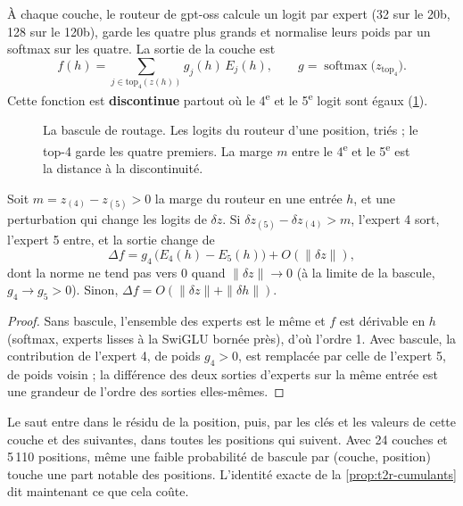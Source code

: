 À chaque couche, le routeur de gpt-oss calcule un logit par expert (32 sur le 20b, 128 sur le 120b), garde les quatre plus grands et normalise leurs poids par un softmax sur les quatre. La sortie de la couche est
\[
f(h) = \sum_{j \in \mathrm{top}_4(z(h))} g_j(h)\, E_j(h), \qquad g = \operatorname{softmax}\big(z_{\mathrm{top}_4}\big).
\]
Cette fonction est \textbf{discontinue} partout où le 4\textsuperscript{e} et le 5\textsuperscript{e} logit sont égaux (\cref{fig:t2r-bascule}).

\begin{figure}[ht]
\centering
\SchemaRefBascule
\caption[La bascule de routage]{La bascule de routage. Les logits du routeur d'une position, triés ; le top-4 garde les quatre premiers. La marge $m$ entre le 4\textsuperscript{e} et le 5\textsuperscript{e} est la distance à la discontinuité.}
\label{fig:t2r-bascule}
\end{figure}

\begin{proposition}\label{prop:t2r-saut}
Soit $m = z_{(4)} - z_{(5)} > 0$ la marge du routeur en une entrée $h$, et une perturbation qui change les logits de $\delta z$. Si $\delta z_{(5)} - \delta z_{(4)} > m$, l'expert 4 sort, l'expert 5 entre, et la sortie change de
\[
\Delta f = g_4\,\big(E_4(h) - E_5(h)\big) + O(\|\delta z\|),
\]
dont la norme ne tend pas vers 0 quand $\|\delta z\| \to 0$ (à la limite de la bascule, $g_4 \to g_5 > 0$). Sinon, $\Delta f = O(\|\delta z\| + \|\delta h\|)$.
\end{proposition}

\begin{proof}
Sans bascule, l'ensemble des experts est le même et $f$ est dérivable en $h$ (softmax, experts lisses à la SwiGLU bornée près), d'où l'ordre 1. Avec bascule, la contribution de l'expert 4, de poids $g_4 > 0$, est remplacée par celle de l'expert 5, de poids voisin ; la différence des deux sorties d'experts sur la même entrée est une grandeur de l'ordre des sorties elles-mêmes.
\end{proof}

Le saut entre dans le résidu de la position, puis, par les clés et les valeurs de cette couche et des suivantes, dans toutes les positions qui suivent. Avec 24 couches et 5\,110 positions, même une faible probabilité de bascule par (couche, position) touche une part notable des positions. L'identité exacte de la \cref{prop:t2r-cumulants} dit maintenant ce que cela coûte.

